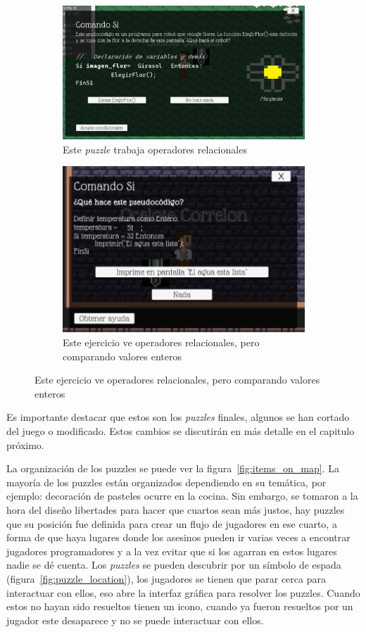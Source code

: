 \begin{itemize}
        \begin{figure}[H]
        \ContinuedFloat
        \centering
        \begin{subfigure}{\textwidth}
            \centering
            \includegraphics[width=0.5\linewidth]{images/Puzzlecondicional3.png}
            \caption{Este \textit{puzzle} trabaja operadores relacionales}
            \label{fig:puzzle_condicionale3}
        \end{subfigure}
        \begin{subfigure}{\textwidth}
            \centering
            \includegraphics[width=0.5\linewidth]{images/Puzzlecondicional4.png}
            \caption{Este ejercicio ve operadores relacionales, pero comparando valores enteros}
            \label{fig:puzzle_condicionales4}
        \end{subfigure}
    \end{figure}
\end{itemize}

Es importante destacar que estos son los \textit{puzzles} finales, algunos se han cortado del juego o modificado. Estos cambios se discutirán en más detalle en el capitulo próximo. 

La organización de los puzzles se puede ver la figura~\ref{fig:items_on_map}. La mayoría de los puzzles están organizados dependiendo en su temática, por ejemplo: decoración de pasteles ocurre en la cocina. Sin embargo, se tomaron a la hora del diseño libertades para hacer que cuartos sean más justos, hay puzzles que su posición fue definida para crear un flujo de jugadores en ese cuarto, a forma de que haya lugares donde los asesinos pueden ir varias veces a encontrar jugadores programadores y a la vez evitar que si los agarran en estos lugares nadie se dé cuenta.
Los \textit{puzzles} se pueden descubrir por un símbolo de espada (figura~\ref{fig:puzzle_location}), los jugadores se tienen que parar cerca para interactuar con ellos, eso abre la interfaz gráfica para resolver los puzzles. Cuando estos no hayan sido resueltos tienen un icono, cuando ya fueron resueltos por un jugador este desaparece y no se puede interactuar con ellos.

